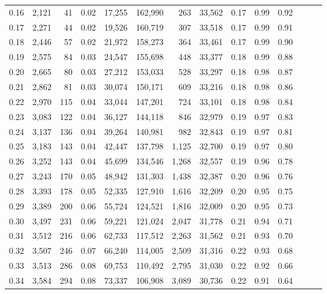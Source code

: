 \begin{tabular}{rrrrrrrrrrrrrr}
0.16 &  2,121 &   41 &  0.02 &   17,255 &  162,990 &     263 &  33,562 &  0.17 &  0.99 &      0.92 \\
0.17 &  2,271 &   44 &  0.02 &   19,526 &  160,719 &     307 &  33,518 &  0.17 &  0.99 &      0.91 \\
0.18 &  2,446 &   57 &  0.02 &   21,972 &  158,273 &     364 &  33,461 &  0.17 &  0.99 &      0.90 \\
0.19 &  2,575 &   84 &  0.03 &   24,547 &  155,698 &     448 &  33,377 &  0.18 &  0.99 &      0.88 \\
0.20 &  2,665 &   80 &  0.03 &   27,212 &  153,033 &     528 &  33,297 &  0.18 &  0.98 &      0.87 \\
0.21 &  2,862 &   81 &  0.03 &   30,074 &  150,171 &     609 &  33,216 &  0.18 &  0.98 &      0.86 \\
0.22 &  2,970 &  115 &  0.04 &   33,044 &  147,201 &     724 &  33,101 &  0.18 &  0.98 &      0.84 \\
0.23 &  3,083 &  122 &  0.04 &   36,127 &  144,118 &     846 &  32,979 &  0.19 &  0.97 &      0.83 \\
0.24 &  3,137 &  136 &  0.04 &   39,264 &  140,981 &     982 &  32,843 &  0.19 &  0.97 &      0.81 \\
0.25 &  3,183 &  143 &  0.04 &   42,447 &  137,798 &   1,125 &  32,700 &  0.19 &  0.97 &      0.80 \\
0.26 &  3,252 &  143 &  0.04 &   45,699 &  134,546 &   1,268 &  32,557 &  0.19 &  0.96 &      0.78 \\
0.27 &  3,243 &  170 &  0.05 &   48,942 &  131,303 &   1,438 &  32,387 &  0.20 &  0.96 &      0.76 \\
0.28 &  3,393 &  178 &  0.05 &   52,335 &  127,910 &   1,616 &  32,209 &  0.20 &  0.95 &      0.75 \\
0.29 &  3,389 &  200 &  0.06 &   55,724 &  124,521 &   1,816 &  32,009 &  0.20 &  0.95 &      0.73 \\
0.30 &  3,497 &  231 &  0.06 &   59,221 &  121,024 &   2,047 &  31,778 &  0.21 &  0.94 &      0.71 \\
0.31 &  3,512 &  216 &  0.06 &   62,733 &  117,512 &   2,263 &  31,562 &  0.21 &  0.93 &      0.70 \\
0.32 &  3,507 &  246 &  0.07 &   66,240 &  114,005 &   2,509 &  31,316 &  0.22 &  0.93 &      0.68 \\
0.33 &  3,513 &  286 &  0.08 &   69,753 &  110,492 &   2,795 &  31,030 &  0.22 &  0.92 &      0.66 \\
0.34 &  3,584 &  294 &  0.08 &   73,337 &  106,908 &   3,089 &  30,736 &  0.22 &  0.91 &      0.64 \\

\end{tabular}
